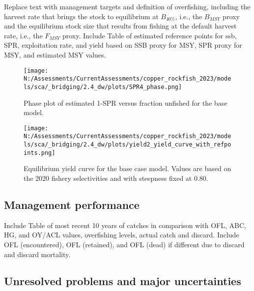 \documentclass[11pt,
  english,
  letterpaper,
]{article}
\begin{document}
Replace text with management targets and definition of overfishing, including the harvest rate that brings the stock to equilibrium at \(B_{40\%}\), i.e., the \(B_{MSY}\) proxy and the equilibrium stock size that results from fishing at the default harvest rate, i.e., the \(F_{MSY}\) proxy. Include Table of estimated reference points for ssb, SPR, exploitation rate, and yield based on SSB proxy for MSY, SPR proxy for MSY, and estimated MSY values.



\begin{figure}
\centering
\texttt{[image: N:/Assessments/CurrentAssessments/copper\_rockfish\_2023/models/sca/\_bridging/2.4\_dw/plots/SPR4\_phase.png]}
\caption{Phase plot of estimated 1-SPR versus fraction unfished for the base model.\label{fig:es-phase}}
\end{figure}

\begin{figure}
\centering
\texttt{[image: N:/Assessments/CurrentAssessments/copper\_rockfish\_2023/models/sca/\_bridging/2.4\_dw/plots/yield2\_yield\_curve\_with\_refpoints.png]}
\caption{Equilibrium yield curve for the base case model. Values are based on the 2020 fishery selectivities and with steepness fixed at 0.80.\label{fig:es-yield}}
\end{figure}

\hypertarget{management-performance}{%
\subsection*{Management performance}\label{management-performance}}

Include Table of most recent 10 years of catches in comparison with OFL, ABC, HG, and OY/ACL values, overfishing levels, actual catch and discard. Include OFL (encountered), OFL (retained), and OFL (dead) if different due to discard and discard mortality.

\hypertarget{unresolved-problems-and-major-uncertainties}{%
\subsection*{Unresolved problems and major uncertainties}\label{unresolved-problems-and-major-uncertainties}}
\end{document}
